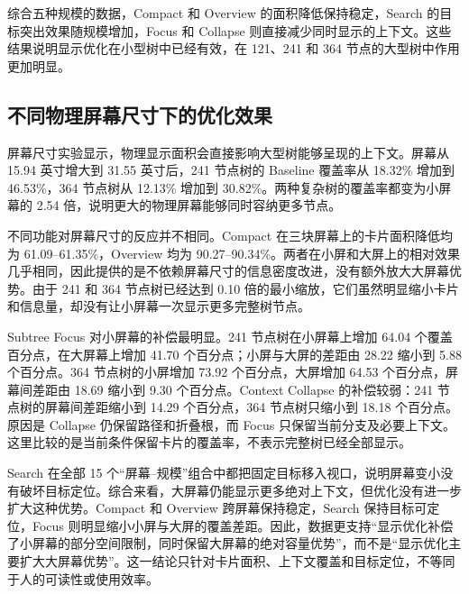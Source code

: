 综合五种规模的数据，Compact 和 Overview 的面积降低保持稳定，Search 的目标突出效果随规模增加，Focus 和 Collapse 则直接减少同时显示的上下文。这些结果说明显示优化在小型树中已经有效，在 121、241 和 364 节点的大型树中作用更加明显。

\subsection{不同物理屏幕尺寸下的优化效果}

屏幕尺寸实验显示，物理显示面积会直接影响大型树能够呈现的上下文。屏幕从 15.94 英寸增大到 31.55 英寸后，241 节点树的 Baseline 覆盖率从 18.32\% 增加到 46.53\%，364 节点树从 12.13\% 增加到 30.82\%。两种复杂树的覆盖率都变为小屏幕的 2.54 倍，说明更大的物理屏幕能够同时容纳更多节点。

不同功能对屏幕尺寸的反应并不相同。Compact 在三块屏幕上的卡片面积降低均为 61.09--61.35\%，Overview 均为 90.27--90.34\%。两者在小屏和大屏上的相对效果几乎相同，因此提供的是不依赖屏幕尺寸的信息密度改进，没有额外放大大屏幕优势。由于 241 和 364 节点树已经达到 0.10 倍的最小缩放，它们虽然明显缩小卡片和信息量，却没有让小屏幕一次显示更多完整树节点。

Subtree Focus 对小屏幕的补偿最明显。241 节点树在小屏幕上增加 64.04 个覆盖百分点，在大屏幕上增加 41.70 个百分点；小屏与大屏的差距由 28.22 缩小到 5.88 个百分点。364 节点树的小屏增加 73.92 个百分点，大屏增加 64.53 个百分点，屏幕间差距由 18.69 缩小到 9.30 个百分点。Context Collapse 的补偿较弱：241 节点树的屏幕间差距缩小到 14.29 个百分点，364 节点树只缩小到 18.18 个百分点。原因是 Collapse 仍保留路径和折叠根，而 Focus 只保留当前分支及必要上下文。这里比较的是当前条件保留卡片的覆盖率，不表示完整树已经全部显示。

Search 在全部 15 个“屏幕--规模”组合中都把固定目标移入视口，说明屏幕变小没有破坏目标定位。综合来看，大屏幕仍能显示更多绝对上下文，但优化没有进一步扩大这种优势。Compact 和 Overview 跨屏幕保持稳定，Search 保持目标可定位，Focus 则明显缩小小屏与大屏的覆盖差距。因此，数据更支持“显示优化补偿了小屏幕的部分空间限制，同时保留大屏幕的绝对容量优势”，而不是“显示优化主要扩大大屏幕优势”。这一结论只针对卡片面积、上下文覆盖和目标定位，不等同于人的可读性或使用效率。
